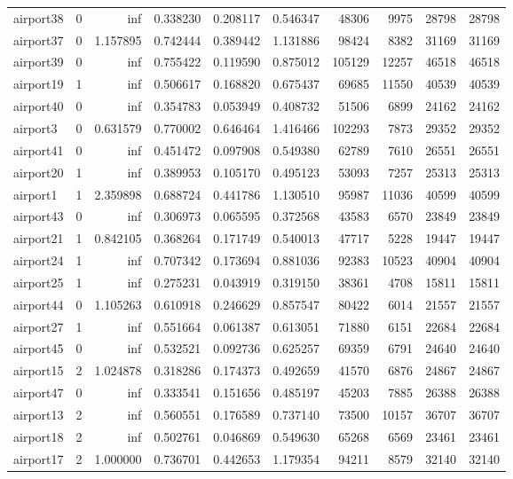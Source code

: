 \documentclass[../../../thesis.tex]{subfiles}
\begin{document}
\begin{longtable}{|l|r|r|r|r|r|r|r|r|r|}
airport38 & 0 & inf & 0.338230 & 0.208117 & 0.546347 & 48306 & 9975 & 28798 & 28798 \\
airport37 & 0 & 1.157895 & 0.742444 & 0.389442 & 1.131886 & 98424 & 8382 & 31169 & 31169 \\
airport39 & 0 & inf & 0.755422 & 0.119590 & 0.875012 & 105129 & 12257 & 46518 & 46518 \\
airport19 & 1 & inf & 0.506617 & 0.168820 & 0.675437 & 69685 & 11550 & 40539 & 40539 \\
airport40 & 0 & inf & 0.354783 & 0.053949 & 0.408732 & 51506 & 6899 & 24162 & 24162 \\
airport3 & 0 & 0.631579 & 0.770002 & 0.646464 & 1.416466 & 102293 & 7873 & 29352 & 29352 \\
airport41 & 0 & inf & 0.451472 & 0.097908 & 0.549380 & 62789 & 7610 & 26551 & 26551 \\
airport20 & 1 & inf & 0.389953 & 0.105170 & 0.495123 & 53093 & 7257 & 25313 & 25313 \\
airport1 & 1 & 2.359898 & 0.688724 & 0.441786 & 1.130510 & 95987 & 11036 & 40599 & 40599 \\
airport43 & 0 & inf & 0.306973 & 0.065595 & 0.372568 & 43583 & 6570 & 23849 & 23849 \\
airport21 & 1 & 0.842105 & 0.368264 & 0.171749 & 0.540013 & 47717 & 5228 & 19447 & 19447 \\
airport24 & 1 & inf & 0.707342 & 0.173694 & 0.881036 & 92383 & 10523 & 40904 & 40904 \\
airport25 & 1 & inf & 0.275231 & 0.043919 & 0.319150 & 38361 & 4708 & 15811 & 15811 \\
airport44 & 0 & 1.105263 & 0.610918 & 0.246629 & 0.857547 & 80422 & 6014 & 21557 & 21557 \\
airport27 & 1 & inf & 0.551664 & 0.061387 & 0.613051 & 71880 & 6151 & 22684 & 22684 \\
airport45 & 0 & inf & 0.532521 & 0.092736 & 0.625257 & 69359 & 6791 & 24640 & 24640 \\
airport15 & 2 & 1.024878 & 0.318286 & 0.174373 & 0.492659 & 41570 & 6876 & 24867 & 24867 \\
airport47 & 0 & inf & 0.333541 & 0.151656 & 0.485197 & 45203 & 7885 & 26388 & 26388 \\
airport13 & 2 & inf & 0.560551 & 0.176589 & 0.737140 & 73500 & 10157 & 36707 & 36707 \\
airport18 & 2 & inf & 0.502761 & 0.046869 & 0.549630 & 65268 & 6569 & 23461 & 23461 \\
airport17 & 2 & 1.000000 & 0.736701 & 0.442653 & 1.179354 & 94211 & 8579 & 32140 & 32140 \\

\end{longtable}
\end{document}
